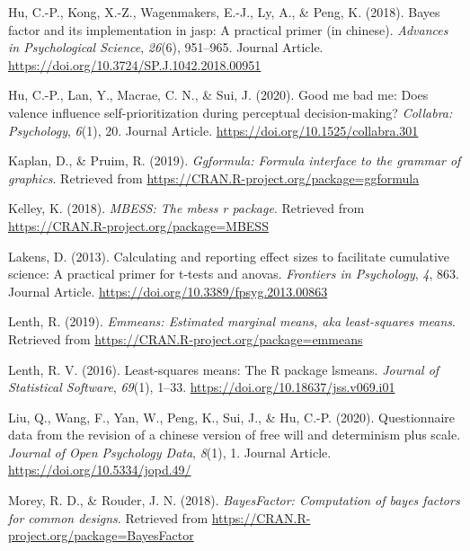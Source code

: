\documentclass[
  english,
  man]{apa6}
\begin{document}
\leavevmode\hypertarget{ref-Hu_2018_JASP}{}%
Hu, C.-P., Kong, X.-Z., Wagenmakers, E.-J., Ly, A., \& Peng, K. (2018). Bayes factor and its implementation in jasp: A practical primer (in chinese). \emph{Advances in Psychological Science}, \emph{26}(6), 951--965. Journal Article. \url{https://doi.org/10.3724/SP.J.1042.2018.00951}

\leavevmode\hypertarget{ref-Hu_2020_GoodSelf}{}%
Hu, C.-P., Lan, Y., Macrae, C. N., \& Sui, J. (2020). Good me bad me: Does valence influence self-prioritization during perceptual decision-making? \emph{Collabra: Psychology}, \emph{6}(1), 20. Journal Article. \url{https://doi.org/10.1525/collabra.301}

\leavevmode\hypertarget{ref-R-ggformula}{}%
Kaplan, D., \& Pruim, R. (2019). \emph{Ggformula: Formula interface to the grammar of graphics}. Retrieved from \url{https://CRAN.R-project.org/package=ggformula}

\leavevmode\hypertarget{ref-R-MBESS}{}%
Kelley, K. (2018). \emph{MBESS: The mbess r package}. Retrieved from \url{https://CRAN.R-project.org/package=MBESS}

\leavevmode\hypertarget{ref-Lakens_2013}{}%
Lakens, D. (2013). Calculating and reporting effect sizes to facilitate cumulative science: A practical primer for t-tests and anovas. \emph{Frontiers in Psychology}, \emph{4}, 863. Journal Article. \url{https://doi.org/10.3389/fpsyg.2013.00863}

\leavevmode\hypertarget{ref-R-emmeans}{}%
Lenth, R. (2019). \emph{Emmeans: Estimated marginal means, aka least-squares means}. Retrieved from \url{https://CRAN.R-project.org/package=emmeans}

\leavevmode\hypertarget{ref-R-lsmeans}{}%
Lenth, R. V. (2016). Least-squares means: The R package lsmeans. \emph{Journal of Statistical Software}, \emph{69}(1), 1--33. \url{https://doi.org/10.18637/jss.v069.i01}

\leavevmode\hypertarget{ref-Liu_2020_JOPD}{}%
Liu, Q., Wang, F., Yan, W., Peng, K., Sui, J., \& Hu, C.-P. (2020). Questionnaire data from the revision of a chinese version of free will and determinism plus scale. \emph{Journal of Open Psychology Data}, \emph{8}(1), 1. Journal Article. \url{https://doi.org/10.5334/jopd.49/}

\leavevmode\hypertarget{ref-R-BayesFactor}{}%
Morey, R. D., \& Rouder, J. N. (2018). \emph{BayesFactor: Computation of bayes factors for common designs}. Retrieved from \url{https://CRAN.R-project.org/package=BayesFactor}
\end{document}
